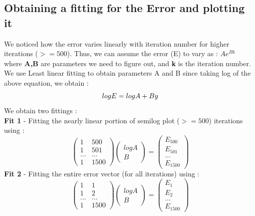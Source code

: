 \documentclass[11pt, a4paper]{article}
\begin{document}
\subsection{Obtaining a fitting for the Error and plotting it}
We noticed how the error varies linearly with iteration number for higher iterations ($>= 500$).
Thus,  we can assume the error (E) to vary as :
$Ae^{Bk}$\\
where \textbf{A,B} are parameters we need to figure out, and \textbf{k} is the iteration number.
We use Least linear fitting to obtain parameters A and B since taking log of the above equation, we obtain :
\begin{equation}\label{eq:4}
log E = log A + By \\
\end{equation}
We obtain two fittings :\\
\textbf{Fit 1} - Fitting the nearly linear portion of semilog plot ($>= 500$) iterations using :
\begin{equation}\label{eq:5}
\begin{pmatrix}
1 & 500 \\
1 & 501 \\
... & ... \\
1 & 1500 
\end{pmatrix}
\begin{pmatrix}
log A \\
B
\end{pmatrix}
=
\begin{pmatrix}
E_{500} \\
E_{501} \\
... \\
E_{1500}
\end{pmatrix}
\end{equation}
\textbf{Fit 2} - Fitting the entire error vector (for all iterations) using :
\begin{equation}\label{eq:6}
\begin{pmatrix}
1 & 1 \\
1 & 2 \\
... & ... \\
1 & 1500 
\end{pmatrix}
\begin{pmatrix}
log A \\
B
\end{pmatrix}
=
\begin{pmatrix}
E_{1} \\
E_{2} \\
... \\
E_{1500}
\end{pmatrix}
\end{equation}
\end{document}
